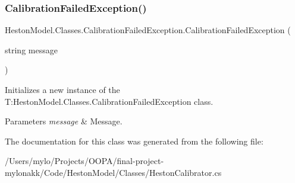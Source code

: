 \subsubsection{\texorpdfstring{Calibration\+Failed\+Exception()}{CalibrationFailedException()}}
{\footnotesize\ttfamily Heston\+Model.\+Classes.\+Calibration\+Failed\+Exception.\+Calibration\+Failed\+Exception (\begin{DoxyParamCaption}\item[{string}]{message }\end{DoxyParamCaption})\hspace{0.3cm}{\ttfamily [inline]}}



Initializes a new instance of the T\+:\+Heston\+Model.\+Classes.\+Calibration\+Failed\+Exception class. 


\begin{DoxyParams}{Parameters}
{\em message} & Message.\\
\hline
\end{DoxyParams}


The documentation for this class was generated from the following file\+:\begin{DoxyCompactItemize}
\item 
/\+Users/mylo/\+Projects/\+O\+O\+P\+A/final-\/project-\/mylonakk/\+Code/\+Heston\+Model/\+Classes/Heston\+Calibrator.\+cs\end{DoxyCompactItemize}
